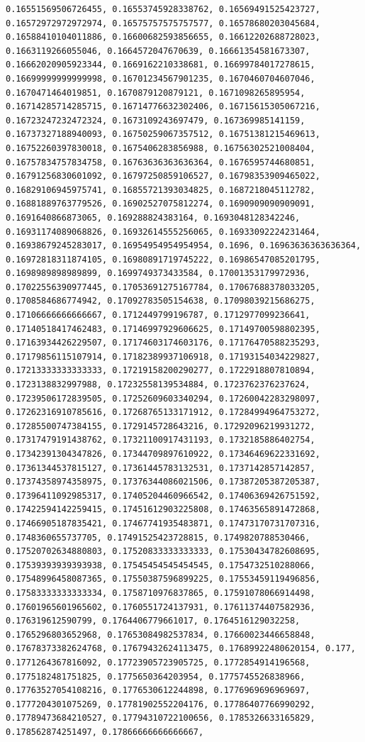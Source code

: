 \documentclass[11pt]{article}
\begin{document}
\begin{Verbatim}[commandchars=\\\{\}]
0.16551569506726455, 0.16553745928338762, 0.16569491525423727, 0.16572972972972974, 0.16575757575757577, 0.16578680203045684, 0.16588410104011886, 0.16600682593856655, 0.16612202688728023, 0.1663119266055046, 0.1664572047670639, 0.16661354581673307, 0.16662020905923344, 0.1669162210338681, 0.16699784017278615, 0.16699999999999998, 0.16701234567901235, 0.1670460704607046, 0.1670471464019851, 0.1670879120879121, 0.1671098265895954, 0.16714285714285715, 0.16714776632302406, 0.16715615305067216, 0.16723247232472324, 0.1673109243697479, 0.167369985141159, 0.16737327188940093, 0.16750259067357512, 0.16751381215469613, 0.16752260397830018, 0.1675406283856988, 0.16756302521008404, 0.16757834757834758, 0.16763636363636364, 0.1676595744680851, 0.16791256830601092, 0.16797250859106527, 0.16798353909465022, 0.16829106945975741, 0.16855721393034825, 0.1687218045112782, 0.16881889763779526, 0.16902527075812274, 0.1690909090909091, 0.1691640866873065, 0.169288824383164, 0.1693048128342246, 0.16931174089068826, 0.16932614555256065, 0.16933092224231464, 0.16938679245283017, 0.16954954954954954, 0.1696, 0.16963636363636364, 0.16972818311874105, 0.16980891719745222, 0.16986547085201795, 0.1698989898989899, 0.1699749373433584, 0.17001353179972936, 0.17022556390977445, 0.17053691275167784, 0.17067688378033205, 0.1708584686774942, 0.17092783505154638, 0.17098039215686275, 0.17106666666666667, 0.1712449799196787, 0.1712977099236641, 0.17140518417462483, 0.17146997929606625, 0.17149700598802395, 0.17163934426229507, 0.17174603174603176, 0.17176470588235293, 0.17179856115107914, 0.17182389937106918, 0.17193154034229827, 0.17213333333333333, 0.17219158200290277, 0.1722918807810894, 0.1723138832997988, 0.17232558139534884, 0.1723762376237624, 0.17239506172839505, 0.17252609603340294, 0.17260042283298097, 0.17262316910785616, 0.17268765133171912, 0.17284994964753272, 0.17285500747384155, 0.1729145728643216, 0.17292096219931272, 0.17317479191438762, 0.17321100917431193, 0.1732185886402754, 0.17342391304347826, 0.17344709897610922, 0.17346469622331692, 0.17361344537815127, 0.17361445783132531, 0.1737142857142857, 0.17374358974358975, 0.17376344086021506, 0.17387205387205387, 0.17396411092985317, 0.17405204460966542, 0.17406369426751592, 0.17422594142259415, 0.17451612903225808, 0.17463565891472868, 0.17466905187835421, 0.17467741935483871, 0.17473170731707316, 0.1748360655737705, 0.17491525423728815, 0.1749820788530466, 0.17520702634880803, 0.17520833333333333, 0.17530434782608695, 0.17539393939393938, 0.17545454545454545, 0.1754732510288066, 0.17548996458087365, 0.17550387596899225, 0.17553459119496856, 0.17583333333333334, 0.1758710976837865, 0.17591078066914498, 0.17601965601965602, 0.1760551724137931, 0.17611374407582936, 0.176319612590799, 0.1764406779661017, 0.1764516129032258, 0.1765296803652968, 0.17653084982537834, 0.17660023446658848, 0.17678373382624768, 0.17679432624113475, 0.17689922480620154, 0.177, 0.1771264367816092, 0.17723905723905725, 0.1772854914196568, 0.1775182481751825, 0.1775650364203954, 0.1775745526838966, 0.17763527054108216, 0.1776530612244898, 0.1776969696969697, 0.1777204301075269, 0.17781902552204176, 0.17786407766990292, 0.17789473684210527, 0.17794310722100656, 0.1785326633165829, 0.178562874251497, 0.17866666666666667, 
\end{Verbatim}
\end{document}
